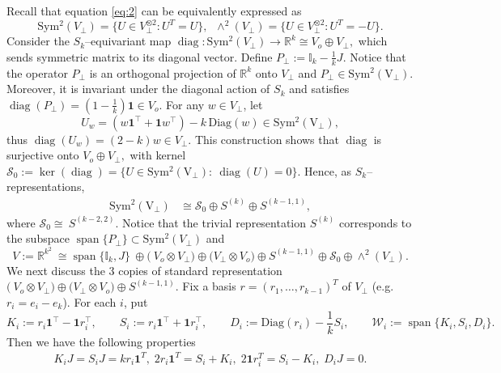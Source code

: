 \documentclass{amsart}%
\begin{document}
Recall that equation \eqref{eq:2} can be equivalently expressed as
\[
\operatorname{Sym^2}(V_{\perp})=\{U\in V_{\perp}^{\otimes 2}:U^T=U\},\;\;\wedge^2(V_{\perp})=\{U\in V_{\perp}^{\otimes 2}:U^T=-U\}.
\]
Consider the $S_k$–equivariant map 
$\operatorname{diag}:\operatorname{Sym^2}(V_{\perp})\to \mathbb R^k\cong V_o\oplus V_\perp,$
which sends symmetric matrix to its diagonal vector. Define
$P_{\perp}:=\mathbb I_k-\frac{1}{k}J.$
Notice that the operator $P_{\perp}$ is an orthogonal projection of $\mathbb R^k$ onto $V_{\perp}$ and $P_{\perp}\in \operatorname{Sym^2(V_{\perp})}.$ Moreover, it is invariant under the diagonal action of $S_k$ and satisfies $\operatorname{diag}(P_{\perp})=(1-\frac{1}{k})\mathbf 1\in V_o.$
For any \(w\in V_\perp\), let 
\[
U_w=(w\mathbf 1^\top+\mathbf 1 w^\top)-k\,\mathrm{Diag}(w) \in\operatorname{Sym^2(V_{\perp})},
\]
thus
\(\operatorname{diag}(U_w)=(2-k)w\in V_{\perp}\). This construction shows that 
$\operatorname{diag}$ is surjective onto $V_{o}\oplus V_{\perp},$ with kernel 
$\mathcal S_0:=\ker(\operatorname{diag})
=\{U\in \operatorname{Sym^2(V_{\perp})}:\ \operatorname{diag}(U)=0\}.$
Hence, as $S_k$–representations,
\begin{align*}
\operatorname{Sym^2(V_{\perp})}
&\cong\mathcal S_0\oplus S^{(k)}\oplus S^{(k-1,1)},
\end{align*}
where $\mathcal S_0\cong\ S^{(k-2,2)}.$ Notice that 
the trivial representation 
$S^{(k)}$ corresponds to the subspace $\operatorname{span}\{P_{\perp}\}\subset \operatorname{Sym^2}(V_{\perp})$ and 
\begin{equation}\label{eq:Rkk-decomp}
V:=\mathbb R^{k^2}\ \cong\operatorname{span}\{\mathbb I_k,J\}
\ \oplus\Big(\ V_o\otimes V_{\perp}\Big)\oplus \Big(V_{\perp}\otimes V_o\Big)\oplus S^{(k-1,1)}\oplus \mathcal S_0 \oplus \wedge^2(V_{\perp}) 
.
\end{equation}
We next discuss the 3 copies of standard representation $\Big(\ V_o\otimes V_{\perp}\Big)\oplus \Big(V_{\perp}\otimes V_o\Big)\oplus S^{(k-1,1)}.$
Fix a basis \(r=(r_1,\dots,r_{k-1})^T\) of \(V_\perp\) (e.g.\ \(r_i=e_i-e_k\)).
For each \(i\), put
\begin{equation}\label{eq:KSD}
K_i:=r_i\mathbf 1^\top-\mathbf 1 r_i^\top,\qquad
S_i:=r_i\mathbf 1^\top+\mathbf 1 r_i^\top,\qquad
D_i:=\mathrm{Diag}(r_i)-\frac{1}{k}S_i,\qquad
\mathcal W_i:=\operatorname{span}\{K_i,S_i,D_i\}.
\end{equation}
Then we have the following properties
\begin{align}\label{eq:standard}
K_iJ=S_iJ=kr_i\mathbf 1^T,\; 2r_i\mathbf 1^T=S_i+K_i,\; 2\mathbf 1r_i^T=S_i-K_i,\; D_iJ=0.
\end{align}
\end{document}
